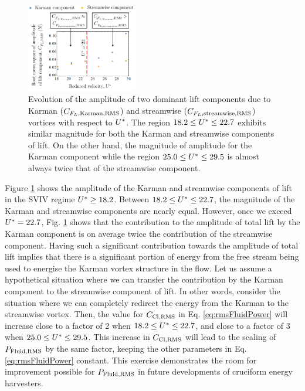 \documentclass[oneside]{utmthesis}
\begin{document}
\begin{figure}
  \centering
  \includegraphics[width=0.43\textwidth]{figs/karmanStreamwiseComponents}
  \caption{Evolution of the \rms{} amplitude of two dominant lift components due to Karman ($C_{F_{L},\text{Karman},\text{RMS}}$) and streamwise ($C_{F_{L},\text{streamwise},\text{RMS}}$) vortices with respect to $U^{*}$. The region $18.2 \leq U^{*} \leq 22.7$ exhibits similar magnitude for both the Karman and streamwise components of lift. On the other hand, the magnitude of amplitude for the Karman component while the region $25.0 \leq U^{*} \leq 29.5$ is almost always twice that of the streamwise component.}
  \label{fig:karmanStreamwiseComponents}
\end{figure}

Figure \ref{fig:karmanStreamwiseComponents} shows the \rms{} amplitude of the Karman and streamwise components of lift in the SVIV regime $U^{*} \geq 18.2$. Between $18.2 \leq U^{*} \leq 22.7$, the magnitude of the Karman and streamwise components are nearly equal. However, once we exceed $U^{*} = 22.7$, Fig. \ref{fig:karmanStreamwiseComponents} shows that the contribution to the \rms{} amplitude of total lift by the Karman component is on average twice the contribution of the streamwise component. Having such a significant contribution towards the \rms{} amplitude of total lift implies that there is a significant portion of energy from the free stream being used to energise the Karman vortex structure in the flow. Let us assume a hypothetical situation where we can transfer the contribution by the Karman component to the streamwise component of lift. In other words, consider the situation where we can completely redirect the energy from the Karman to the streamwise vortex. Then, the value for $C_{\text{Cl},\text{RMS}}$ in Eq. \ref{eq:rmsFluidPower} will increase close to a factor of 2 when $18.2 \leq U^{*} \leq 22.7$, and close to a factor of 3 when $25.0 \leq U^{*} \leq 29.5$. This increase in $C_{\text{Cl},\text{RMS}}$ will lead to the scaling of $P_{\text{Fluid,RMS}}$ by the same factor, keeping the other parameters in Eq. \ref{eq:rmsFluidPower} constant. This exercise demonstrates the room for improvement possible for $P_{\text{Fluid,RMS}}$ in future developments of cruciform energy harvesters.
\end{document}
